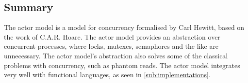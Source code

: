 \subsection{Summary}
The actor model is a model for concurrency formalised by Carl Hewitt, based on the work of C.A.R. Hoare. The actor model provides an abstraction over concurrent processes, where locks, mutexes, semaphores and the like are unnecessary. The actor model's abstraction also solves some of the classical problems with concurrency, such as phantom reads. The actor model integrates very well with functional languages, as seen in \cref{sub:implementations}.
